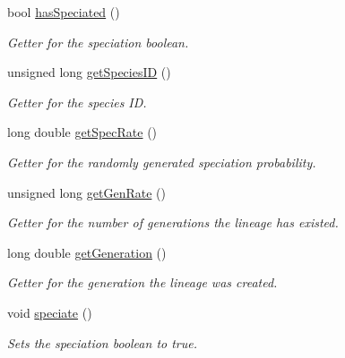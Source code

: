 \begin{DoxyCompactItemize}
bool \hyperlink{class_treenode_a5e37d24c2f1808262518402fcf50183c}{has\+Speciated} ()
\begin{DoxyCompactList}\small\item\em Getter for the speciation boolean. \end{DoxyCompactList}\item 
unsigned long \hyperlink{class_treenode_ad1a1ea65124c7db886de695522ea3272}{get\+Species\+ID} ()
\begin{DoxyCompactList}\small\item\em Getter for the species ID. \end{DoxyCompactList}\item 
long double \hyperlink{class_treenode_a50699133e245bae92dbdf3fcf30eccd9}{get\+Spec\+Rate} ()
\begin{DoxyCompactList}\small\item\em Getter for the randomly generated speciation probability. \end{DoxyCompactList}\item 
unsigned long \hyperlink{class_treenode_a0414c6a3ff3dad43f4e2e1b441ceb617}{get\+Gen\+Rate} ()
\begin{DoxyCompactList}\small\item\em Getter for the number of generations the lineage has existed. \end{DoxyCompactList}\item 
long double \hyperlink{class_treenode_ab89bf951b5e557a2cf72294e5e289b19}{get\+Generation} ()
\begin{DoxyCompactList}\small\item\em Getter for the generation the lineage was created. \end{DoxyCompactList}\item 
void \hyperlink{class_treenode_a094f8313cfeaedee44c967d7b750019b}{speciate} ()\hypertarget{class_treenode_a094f8313cfeaedee44c967d7b750019b}{}\label{class_treenode_a094f8313cfeaedee44c967d7b750019b}

\begin{DoxyCompactList}\small\item\em Sets the speciation boolean to true. \end{DoxyCompactList}\end{DoxyCompactItemize}
